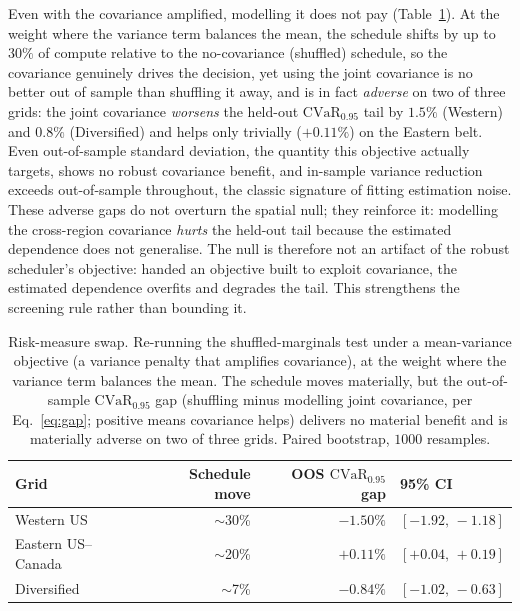 \documentclass[12pt]{article}
\newcommand{\CVaR}{\mathrm{CVaR}}
\begin{document}
Even with the covariance amplified, modelling it does not pay (Table~\ref{tab:swap}). At
the weight where the variance term balances the mean, the schedule shifts by up to $30\%$
of compute relative to the no-covariance (shuffled) schedule, so the covariance genuinely
drives the decision, yet using the joint covariance is no better out of sample than
shuffling it away, and is in fact \emph{adverse} on two of three grids: the joint
covariance \emph{worsens} the held-out $\CVaR_{0.95}$ tail by $1.5\%$ (Western) and
$0.8\%$ (Diversified) and helps only trivially ($+0.11\%$) on the Eastern belt. Even
out-of-sample standard deviation, the quantity this objective actually targets, shows no
robust covariance benefit, and in-sample variance reduction exceeds out-of-sample
throughout, the classic signature of fitting estimation noise. These adverse gaps do not
overturn the spatial null; they reinforce it: modelling the cross-region covariance
\emph{hurts} the held-out tail because the estimated dependence does not generalise. The
null is therefore not an artifact of the robust scheduler's objective: handed an objective
built to exploit covariance, the estimated dependence overfits and degrades the tail. This
strengthens the screening rule rather than bounding it.

\begin{table}[t]
\centering\small
\caption{Risk-measure swap. Re-running the shuffled-marginals test under a mean-variance
objective (a variance penalty that amplifies covariance), at the weight where the variance
term balances the mean. The
schedule moves materially, but the out-of-sample $\CVaR_{0.95}$ gap (shuffling minus
modelling joint covariance, per Eq.~\eqref{eq:gap}; positive means covariance helps)
delivers no material benefit and is materially adverse on two of three grids. Paired
bootstrap, $1000$ resamples.}
\label{tab:swap}
\begin{tabular}{lrrl}
\toprule
Grid & Schedule move & OOS $\CVaR_{0.95}$ gap & 95\% CI \\
\midrule
Western US         & $\sim$30\% & $-1.50\%$ & $[-1.92,\,-1.18]$ \\
Eastern US--Canada & $\sim$20\% & $+0.11\%$ & $[+0.04,\,+0.19]$ \\
Diversified        & $\sim$7\%  & $-0.84\%$ & $[-1.02,\,-0.63]$ \\
\bottomrule
\end{tabular}
\end{table}
\end{document}
